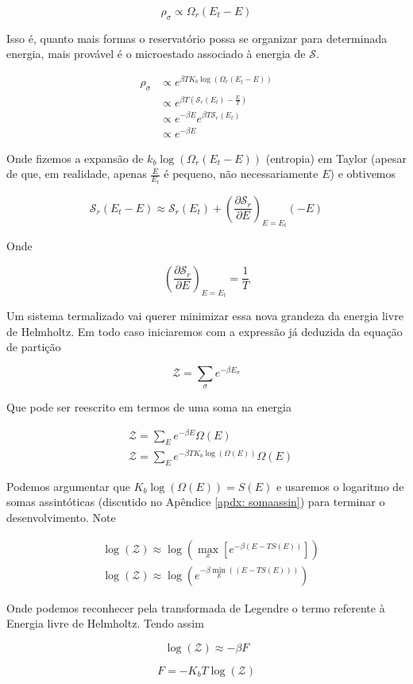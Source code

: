 \[
\rho_\sigma \propto \Omega_r(E_t - E)
\]

Isso é, quanto mais formas o reservatório possa se organizar para determinada energia, mais provável é o microestado associado à energia de $\mathcal{S}$.

\begin{align*}
	\rho_\sigma & \propto e^{\beta T K_b \log{(\Omega_r(E_t - E))}} \\
	& \propto e^{\beta T \left( \mathcal{S}_r(E_t) - \frac{E}{T}\right) } \\
	& \propto e^{-\beta E} e^{\beta T \mathcal{S}_r(E_t)} \\
	& \propto e^{-\beta E}
\end{align*}

Onde fizemos a expansão de $k_b \log{(\Omega_r(E_t - E))}$ (entropia) em Taylor (apesar de que, em realidade, apenas $\frac{E}{E_t}$ é pequeno, não necessariamente $E$) e obtivemos

\[
\mathcal{S}_r(E_t - E) \approx \mathcal{S}_r(E_t) + \left( \frac{\partial \mathcal{S}_r}{\partial E}\right)_{E=E_t} (-E)
\]

Onde 

\[
\left( \frac{\partial \mathcal{S}_r}{\partial E} \right)_{E=E_t} = \frac{1}{T}
\]

Um sistema termalizado vai querer minimizar essa nova grandeza da energia livre de Helmholtz. Em todo caso iniciaremos com a expressão já deduzida da equação de partição

\[
\mathcal{Z} = \sum_{\sigma} e^{-\beta E_\sigma}
\]

Que pode ser reescrito em termos de uma soma na energia

\begin{align*}
	& \mathcal{Z} = \sum_{E} e^{-\beta E} \Omega(E) \\
	& \mathcal{Z} = \sum_{E} e^{-\beta T K_b \log{(\Omega(E))}} \Omega(E)
\end{align*}

Podemos argumentar que $ K_b \log{(\Omega(E))} = S(E)$ e usaremos o logaritmo de somas assintóticas (discutido no Apêndice \ref{apdx: somaassin}) para terminar o desenvolvimento. Note

\begin{align*}
	& \log{(\mathcal{Z})} \approx \log{\left( \max_x{[e^{-\beta(E - T S(E))}]} \right)} \\
	& \log{(\mathcal{Z})} \approx \log{\left(e^{-\beta \min_E{((E - T S(E)))}} \right)}
\end{align*}

Onde podemos reconhecer pela transformada de Legendre o termo referente à Energia livre de Helmholtz. Tendo assim

\[
\log{(\mathcal{Z})} \approx -\beta F
\]	

\begin{equation}
	F = - K_b T \log{(\mathcal{Z})}
\end{equation}
